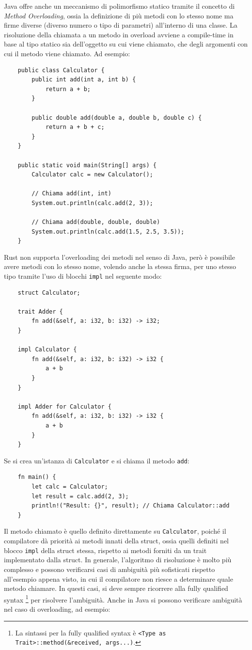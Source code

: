 Java offre anche un meccanismo di polimorfismo statico tramite il concetto di \textit{Method Overloading}, ossia la definizione di più metodi con lo stesso nome ma firme diverse (diverso numero o tipo di parametri) all'interno di una classe. La risoluzione della chiamata a un metodo in overload avviene a compile-time in base al tipo statico sia dell'oggetto su cui viene chiamato, che degli argomenti con cui il metodo viene chiamato. Ad esempio:
\begin{verbatim}
    public class Calculator {
        public int add(int a, int b) {
            return a + b;
        }

        public double add(double a, double b, double c) {
            return a + b + c;
        }
    }

    public static void main(String[] args) {
        Calculator calc = new Calculator();

        // Chiama add(int, int)
        System.out.println(calc.add(2, 3));  

        // Chiama add(double, double, double)
        System.out.println(calc.add(1.5, 2.5, 3.5)); 
    }
\end{verbatim}
Rust non supporta l'overloading dei metodi nel senso di Java, però è possibile avere metodi con lo stesso nome, volendo anche la stessa firma, per uno stesso tipo tramite l'uso di blocchi \texttt{impl} nel seguente modo:
\begin{verbatim}
    struct Calculator;

    trait Adder {
        fn add(&self, a: i32, b: i32) -> i32;
    }

    impl Calculator {
        fn add(&self, a: i32, b: i32) -> i32 {
            a + b
        }
    }

    impl Adder for Calculator {
        fn add(&self, a: i32, b: i32) -> i32 {
            a + b
        }
    }
\end{verbatim}
Se si crea un'istanza di \texttt{Calculator} e si chiama il metodo \texttt{add}:
\begin{verbatim}
    fn main() {
        let calc = Calculator;
        let result = calc.add(2, 3);
        println!("Result: {}", result); // Chiama Calculator::add
    }
\end{verbatim}
Il metodo chiamato è quello definito direttamente su \texttt{Calculator}, poiché il compilatore dà priorità ai metodi innati della struct, ossia quelli definiti nel blocco \texttt{impl} della struct stessa, rispetto ai metodi forniti da un trait implementato dalla struct. In generale, l'algoritmo di risoluzione è molto più complesso e possono verificarsi casi di ambiguità più sofisticati rispetto all'esempio appena visto, in cui il compilatore non riesce a determinare quale metodo chiamare. In questi casi, si deve sempre ricorrere alla fully qualified syntax \footnote{La sintassi per la fully qualified syntax è \texttt{<Type as Trait>::method(\&received, args...)}.} per risolvere l'ambiguità. Anche in Java si possono verificare ambiguità nel caso di overloading, ad esempio:
